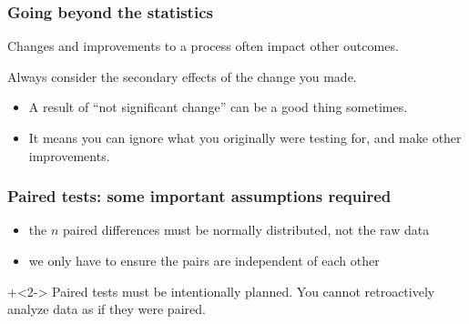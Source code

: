 \begin{frame}\frametitle{Going beyond the statistics}
	Changes and improvements to a process often impact other outcomes.
	
	\begin{exampleblock}{}
		Always consider the secondary effects of the change you made.
	\end{exampleblock}
	
	\vspace{12pt}
	\begin{itemize}
		\item	A result of ``{\color{blue}not significant change}'' can be a good thing sometimes.
		\item	It means you can ignore what you originally were testing for, and make other improvements.
	\end{itemize}
\end{frame}

\begin{frame}\frametitle{Paired tests: some important assumptions required }

	\begin{itemize}
		\item	the $n$ paired differences must be normally distributed, not the raw data
		\item	we only have to ensure the pairs are independent of each other
	\end{itemize}

\onslide+<2->{
	\vspace{12pt}
	Paired tests must be intentionally planned. You cannot retroactively analyze data as if they were paired.
}
\end{frame}

